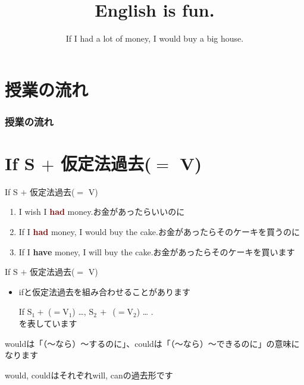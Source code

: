 \documentclass[aspectratio=169,xcolor={dvipsnames,table}]{beamer}
\title{English is fun.}
\subtitle{If I had a lot of money, I would buy a big house.}
\author{}
\institute[]{}
\date[]
\begin{document}
\begin{frame}[plain]
  \titlepage
\end{frame}

\section*{授業の流れ}
\begin{frame}[plain]
  \frametitle{授業の流れ}
  \tableofcontents
\end{frame}
\section{If S $+$ 仮定法過去($=$ V)}

\begin{frame}[plain]{If S $+$ 仮定法過去($=$ V)}
 \large
\begin{enumerate} 
 \item I wish I \textcolor{Maroon}{\bfseries had} money.\hfill{\scriptsize お金があったらいいのに}
 \item If I \textcolor{Maroon}{\bfseries had} money, I would buy the cake.\hfill{\scriptsize お金があったらそのケーキを買うのに}
 \item If I \textcolor{NavyBlue}{\bfseries have} money, I will buy the cake.\hfill{\scriptsize お金があったらそのケーキを買います}
\end{enumerate}


\begin{block}{If S $+$ 仮定法過去($=$ V)\mbox{}\hfill{} }
\small
\begin{itemize}[square]
 \item ifと仮定法過去を組み合わせることがあります\par
If $\text{S}_{1} +$ ($= \text{V}_{1}$) \ldots \hspace{2pt},\hspace{10pt}
 $\text{S}_{2}\,+$ \,($=\text{V}_{2}$) \ldots\hspace{2pt} .\\[10pt]
\hfill{}を表しています
\end{itemize}

\hfill{\scriptsize wouldは「（～なら）～するのに」、couldは「（～なら）～できるのに」の意味になります}

\hfill{\scriptsize would, couldはそれぞれwill, canの過去形です}
 

\end{block}
\end{frame}
\end{document}
